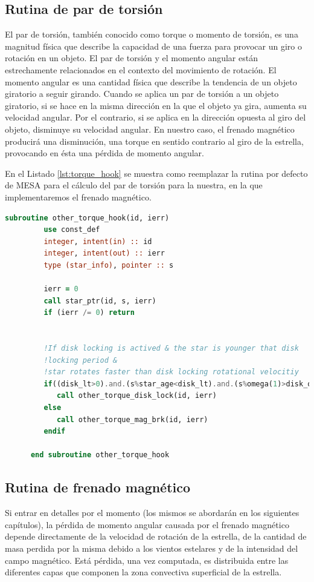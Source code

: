 \subsection{Rutina de par de torsión}
El par de torsión, también conocido como torque o momento de torsión, es una magnitud física que describe la capacidad de una fuerza para provocar un giro o rotación en un objeto. El par de torsión y el momento angular están estrechamente relacionados en el contexto del movimiento de rotación. El momento angular es una cantidad física que describe la tendencia de un objeto giratorio a seguir girando. Cuando se aplica un par de torsión a un objeto giratorio, si se hace en la misma dirección en la que el objeto ya gira, aumenta su velocidad angular. Por el contrario, si se aplica en la dirección opuesta al giro del objeto, disminuye su velocidad angular. En nuestro caso, el frenado magnético producirá una disminución, una torque en sentido contrario al giro de la estrella, provocando en ésta una pérdida de momento angular.\par

En el Listado \ref{lst:torque_hook} se muestra como reemplazar la rutina por defecto de MESA para el cálculo del par de torsión para la nuestra, en la que implementaremos el frenado magnético. 
 
\begin{lstlisting}[language=Fortran, float, caption={Rutina de par de torsión.}, label={lst:torque_hook}]
      subroutine other_torque_hook(id, ierr)
         use const_def
         integer, intent(in) :: id
         integer, intent(out) :: ierr
         type (star_info), pointer :: s

         ierr = 0
         call star_ptr(id, s, ierr)
         if (ierr /= 0) return


         !If disk locking is actived & the star is younger that disk 
         !locking period &
         !star rotates faster than disk locking rotational velocitiy
         if((disk_lt>0).and.(s%star_age<disk_lt).and.(s%omega(1)>disk_omega)) then
            call other_torque_disk_lock(id, ierr)
         else
            call other_torque_mag_brk(id, ierr)
         endif
         
      end subroutine other_torque_hook
\end{lstlisting}

\subsection{Rutina de frenado magnético}
Si entrar en detalles por el momento (los mismos se abordarán en los siguientes capítulos), la pérdida de momento angular causada por el frenado magnético depende directamente de la velocidad de rotación de la estrella, de la cantidad de masa perdida por la misma debido a los vientos estelares y de la intensidad del campo magnético. Está pérdida, una vez computada, es distribuida entre las diferentes capas que componen la zona convectiva superficial de la estrella.\par

